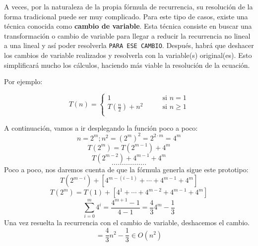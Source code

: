 \documentclass[10pt,a4paper,spanish]{report}
\theoremstyle{definition}
\theoremstyle{remark}
\begin{document}
A veces, por la naturaleza de la propia fórmula de recurrencia, su resolución de la forma tradicional puede ser muy complicado. Para este tipo de casos, existe una técnica conocida como \textbf{\textcolor{YellowOrange}{cambio de variable}}. Esta técnica consiste en buscar una transformación o cambio de variable para llegar a reducir la recurrencia no lineal a una lineal y así poder resolverla \verb|PARA ESE CAMBIO|. Después, habrá que deshacer los cambios de variable realizados y resolverla con la variable(s) original(es). Esto simplificará mucho los cálculos, haciendo más viable la resolución de la ecuación.

Por ejemplo:

\begin{displaymath}
    T(n) = \left\{ \begin{array}{ll}
1 & \qquad \textrm{si $n = 1$}\\
T(\frac{n}{2}) + n^2 & \qquad \textrm{si $n \ge 1$} \\
\end{array} \right.
\end{displaymath}

\begin{center}
    A continuación, vamos a ir desplegando la función poco a poco:
    \begin{displaymath}
        n = 2^m; n^2 = (2^m)^2 = 2^{2\cdot m} = 4^m
    \end{displaymath}
    \begin{displaymath}
        T(2^m) = T(2^{m-1}) + 4^m   
    \end{displaymath}
    \begin{displaymath}
        T(2^{m-2}) + 4^{m-1} + 4^m
    \end{displaymath}
    \begin{displaymath}
        \ldots \ldots \ldots \ldots \ldots \ldots
    \end{displaymath}
    Poco a poco, nos daremos cuenta de que la fórmula generla sigue este prototipo:
    \begin{displaymath}
        T(2^{m-i}) + [4^{m-(i-1)} + \cdots + 4^{m-1} + 4^m]
    \end{displaymath}
    \begin{displaymath}
        T(2^m) = T(1) + [4^1+\cdots+4^{m-2}+4^{m-1}+4^m]
    \end{displaymath}
    \begin{displaymath}
        \sum_{i = 0}^{m} 4^i = \frac{4^{m+1}-1}{4-1} = \frac{4}{3}4^m - \frac{1}{3}
    \end{displaymath}
    Una vez resuelta la recurrencia con el cambio de variable, deshacemos el cambio.
    \begin{displaymath}
        [4^m = n^2] = \frac{4}{3}n^2 - \frac{1}{3} \in O(n^2)
    \end{displaymath}
\end{center}
\end{document}
